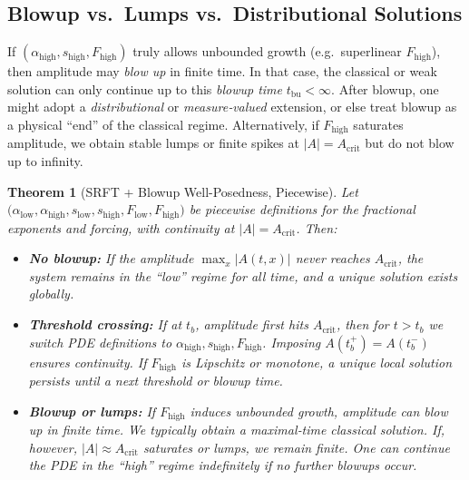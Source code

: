 \documentclass[12pt]{article}
\newtheorem{theorem}{Theorem}[section]
\begin{document}
\subsection{Blowup vs.\ Lumps vs.\ Distributional Solutions}
\label{subsec:blowup_discussion}

If \((\alpha_{\mathrm{high}}, s_{\mathrm{high}}, F_{\mathrm{high}})\) truly allows
unbounded growth (e.g.\ superlinear \(F_{\mathrm{high}}\)), then amplitude may \emph{blow
up} in finite time.  In that case, the classical or weak solution can only continue up to
this \emph{blowup time} \(t_{\mathrm{bu}} < \infty\).  After blowup, one might adopt a
\emph{distributional} or \emph{measure‐valued} extension, or else treat blowup as a
physical “end” of the classical regime.  Alternatively, if \(F_{\mathrm{high}}\) saturates
amplitude, we obtain stable lumps or finite spikes at \(\lvert A\rvert = A_{\mathrm{crit}}\)
but do not blow up to infinity.

\begin{theorem}[SRFT + Blowup Well-Posedness, Piecewise]
\label{thm:ERMBlowup_expanded}
Let
\(\bigl(\alpha_{\mathrm{low}},\alpha_{\mathrm{high}},
       s_{\mathrm{low}},s_{\mathrm{high}},
       F_{\mathrm{low}},F_{\mathrm{high}}\bigr)\)
be piecewise definitions for the fractional exponents and forcing, with continuity at
\(\lvert A\rvert=A_{\mathrm{crit}}\). Then:

\begin{itemize}
\item \textbf{No blowup:} If the amplitude \(\max_x\lvert A(t,x)\rvert\) never reaches
      \(A_{\mathrm{crit}}\), the system remains in the “low” regime for all time, and
      a unique solution exists globally.  
\item \textbf{Threshold crossing:} If at \(t_b\), amplitude first hits \(A_{\mathrm{crit}}\),
      then for \(t>t_b\) we switch PDE definitions to
      \(\alpha_{\mathrm{high}}, s_{\mathrm{high}}, F_{\mathrm{high}}\).  Imposing
      \(A(t_b^+)=A(t_b^-)\) ensures continuity. If
      \(F_{\mathrm{high}}\) is Lipschitz or monotone, a unique local solution persists
      until a next threshold or blowup time.
\item \textbf{Blowup or lumps:} If \(F_{\mathrm{high}}\) induces unbounded growth,
      amplitude can blow up in finite time. We typically obtain a maximal‐time classical
      solution.  If, however, \(\lvert A\rvert\approx A_{\mathrm{crit}}\) saturates or
      lumps, we remain finite.  One can continue the PDE in the “high” regime
      indefinitely if no further blowups occur.
\end{itemize}
\end{theorem}
\end{document}
